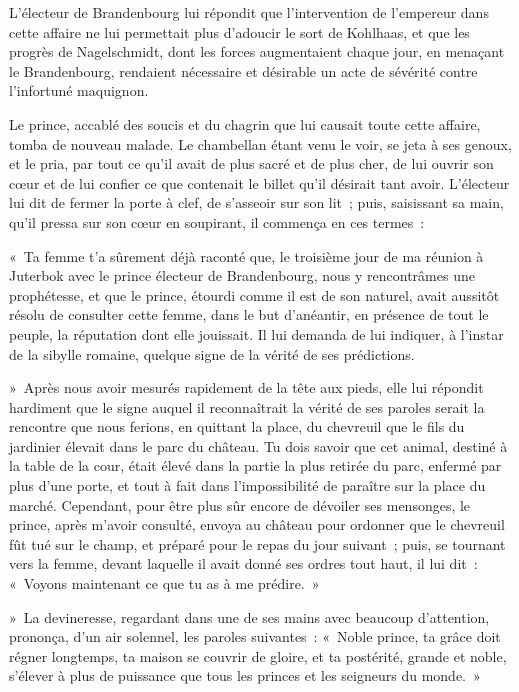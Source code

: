 \documentclass[french,twoside]{book} %
\begin{document}
L’électeur de Brandenbourg lui répondit que l’intervention de l’empereur dans cette affaire ne lui permettait plus d’adoucir le sort de Kohlhaas, et que les progrès de Nagelschmidt, dont les forces augmentaient chaque jour, en menaçant le Brandenbourg, rendaient nécessaire et désirable un acte de sévérité contre l’infortuné maquignon.\par
Le prince, accablé des soucis et du chagrin que lui causait toute cette affaire, tomba de nouveau malade. Le chambellan étant venu le voir, se jeta à ses genoux, et le pria, par tout ce qu’il avait de plus sacré et de plus cher, de lui ouvrir son cœur et de lui confier ce que contenait le billet qu’il désirait tant avoir. L’électeur lui dit de fermer la porte à clef, de s’asseoir sur son lit ; puis, saisissant sa main, qu’il pressa sur son cœur en soupirant, il commença en ces termes :\par
« Ta femme t’a sûrement déjà raconté que, le troisième jour de ma réunion à Juterbok avec le prince électeur de Brandenbourg, nous y rencontrâmes une prophétesse, et que le prince, étourdi comme il est de son naturel, avait aussitôt résolu de consulter cette femme, dans le but d’anéantir, en présence de tout le peuple, la réputation dont elle jouissait. Il lui demanda de lui indiquer, à l’instar de la sibylle romaine, quelque signe de la vérité de ses prédictions.\par
» Après nous avoir mesurés rapidement de la tête aux pieds, elle lui répondit hardiment que le signe auquel il reconnaîtrait la vérité de ses paroles serait la rencontre que nous ferions, en quittant la place, du chevreuil que le fils du jardinier élevait dans le parc du château. Tu dois savoir que cet animal, destiné à la table de la cour, était élevé dans la partie la plus retirée du parc, enfermé par plus d’une porte, et tout à fait dans l’impossibilité de paraître sur la place du marché. Cependant, pour être plus sûr encore de dévoiler ses mensonges, le prince, après m’avoir consulté, envoya au château pour ordonner que le chevreuil fût tué sur le champ, et préparé pour le repas du jour suivant ; puis, se tournant vers la femme, devant laquelle il avait donné ses ordres tout haut, il lui dit : « Voyons maintenant ce que tu as à me prédire. »\par
» La devineresse, regardant dans une de ses mains avec beaucoup d’attention, prononça, d’un air solennel, les paroles suivantes : « Noble prince, ta grâce doit régner longtemps, ta maison se couvrir de gloire, et ta postérité, grande et noble, s’élever à plus de puissance que tous les princes et les seigneurs du monde. »\par
\end{document}
